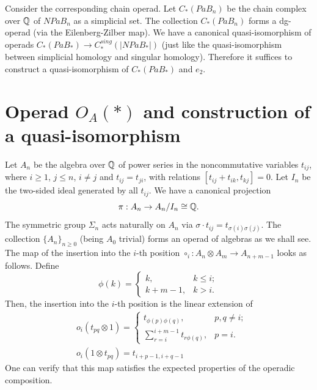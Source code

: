 \documentclass[TFM.tex]{subfiles}
\begin{document}
Consider the corresponding chain operad. Let $C_*(PaB_n)$ be the chain complex over $\mathbb{Q}$ of $NPaB_n$ as a simplicial set. The collection $C_*(PaB_n)$ forms a dg-operad (via the Eilenberg-Zilber map). We have a canonical quasi-isomorphism of operads $C_*(PaB_*)\to C_*^{sing}(|NPaB_*|)$ (just like the quasi-isomorphism between simplicial homology and singular homology). Therefore it suffices to construct a quasi-isomorphism of $C_*(PaB_*)$ and $e_2$.

\section{Operad $O_A(*)$ and construction of a quasi-isomorphism}

Let $A_n$ be the algebra over $\mathbb{Q}$ of power series in the noncommutative variables $t_{ij}$, where $i\geq 1$, $j\leq n$, $i\neq j$ and $t_{ij}=t_{ji}$, with relations $[t_{ij}+t_{ik},t_{kj}]=0$. Let $I_n$ be the two-sided ideal generated by all $t_{ij}$. We have a canonical projection 
\begin{equation}\label{canonical}
\pi:A_n\to A_n/I_n\cong\mathbb{Q}.
\end{equation}
The symmetric group $\Sigma_n$ acts naturally on $A_n$ via $\sigma\cdot t_{ij}=t_{\sigma(i)\sigma(j)}$. The collection $\{A_n\}_{n\geq 0}$ (being $A_0$ trivial) forms an operad of algebras as we shall see. The map of the insertion into the $i$-th position $\circ_i: A_n\otimes A_m\to A_{n+m-1}$ looks as follows. Define
\[
\phi(k)=\begin{cases}
k, & k\leq i;\\
k+m-1, & k>i.
\end{cases}
\]
Then, the insertion into the $i$-th position is the linear extension of
\begin{align*}
&o_i(t_{pq}\otimes 1)=\begin{cases}
t_{\phi(p)\phi(q)}, &p,q\neq i;\\
\sum_{r=i}^{i+m-1}t_{r\phi(q)}, & p=i.
\end{cases} \\
& o_i(1\otimes t_{pq})=t_{i+p-1,i+q-1}
\end{align*}
One can verify that this map satisfies the expected properties of the operadic composition. %
\end{document}
